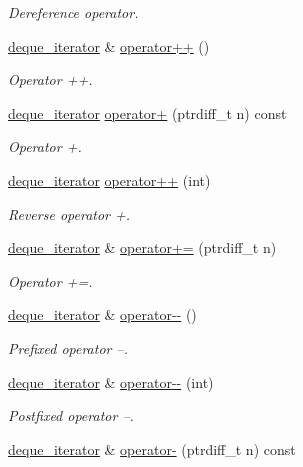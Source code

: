 \begin{DoxyCompactItemize}
\begin{DoxyCompactList}\small\item\em Dereference operator. \end{DoxyCompactList}\item 
\hyperlink{structdeque__iterator}{deque\+\_\+iterator} \& \hyperlink{structdeque__iterator_ae15f463b8188f48d74a679935cd968ba}{operator++} ()
\begin{DoxyCompactList}\small\item\em Operator ++. \end{DoxyCompactList}\item 
\hyperlink{structdeque__iterator}{deque\+\_\+iterator} \hyperlink{structdeque__iterator_afe780014ad74f573b3eb154e91d0f66c}{operator+} (ptrdiff\+\_\+t n) const
\begin{DoxyCompactList}\small\item\em Operator +. \end{DoxyCompactList}\item 
\hyperlink{structdeque__iterator}{deque\+\_\+iterator} \hyperlink{structdeque__iterator_ab00c940267f110d87de358ba0383a9dc}{operator++} (int)
\begin{DoxyCompactList}\small\item\em Reverse operator +. \end{DoxyCompactList}\item 
\hyperlink{structdeque__iterator}{deque\+\_\+iterator} \& \hyperlink{structdeque__iterator_af9e3da57b8d1952b0ec5af9c706fefcb}{operator+=} (ptrdiff\+\_\+t n)
\begin{DoxyCompactList}\small\item\em Operator +=. \end{DoxyCompactList}\item 
\hyperlink{structdeque__iterator}{deque\+\_\+iterator} \& \hyperlink{structdeque__iterator_a9f8508814096bc20b9f00c90335f8235}{operator-\/-\/} ()
\begin{DoxyCompactList}\small\item\em Prefixed operator --. \end{DoxyCompactList}\item 
\hyperlink{structdeque__iterator}{deque\+\_\+iterator} \& \hyperlink{structdeque__iterator_ae9ba6713301a848f537cf476ecb2aacc}{operator-\/-\/} (int)
\begin{DoxyCompactList}\small\item\em Postfixed operator --. \end{DoxyCompactList}\item 
\hyperlink{structdeque__iterator}{deque\+\_\+iterator} \& \hyperlink{structdeque__iterator_ac935040db37548e0e0abefd88033dd5c}{operator-\/} (ptrdiff\+\_\+t n) const

\end{DoxyCompactItemize}
